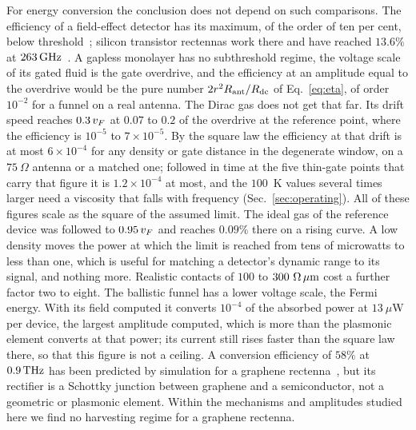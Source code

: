 For energy conversion the conclusion does not depend on such comparisons.
The efficiency of a field-effect detector has its maximum, of the
order of ten per cent, below threshold~\cite{kachorovskii2013performance};
silicon transistor rectennas work there and have reached $13.6\%$ at
$263\,\mathrm{GHz}$~\cite{khan2022cmos}. A gapless monolayer has no subthreshold regime, the voltage
scale of its gated fluid is the gate overdrive, and the efficiency at an
amplitude equal to the overdrive would be the pure number $2r^{2}R_{\mathrm{ant}}/R_{\mathrm{dc}}$ of
Eq.~\eqref{eq:eta}, of order $10^{-2}$ for a funnel on a real antenna.
The Dirac gas does not get that far. Its drift speed reaches $0.3\,v_{F}$
at $0.07$ to $0.2$ of the overdrive at the reference point,
where the efficiency is $10^{-5}$ to
$7\times10^{-5}$. By the square law the efficiency at that drift is at most
$6\times10^{-4}$ for
any density or gate distance in the degenerate window, on a $75\ \Omega$
antenna or a matched one; followed in time at the five
thin-gate points that carry that figure it is
$1.2\times10^{-4}$ at most, and the $100$~K values several times larger
need a viscosity that falls with frequency (Sec.~\ref{sec:operating}).
All of these figures scale as the square of the assumed limit. The ideal
gas of the reference device was followed to $0.95\,v_{F}$ and reaches $0.09\%$
there on a rising curve. A low density moves the power at which the limit
is reached from tens of microwatts to less than one, which is useful for matching a
detector's dynamic range to its signal, and nothing more. Realistic
contacts of $100$ to $300\ \Omega\,\mu\mathrm{m}$ cost a further factor two to eight.
The ballistic funnel has a lower voltage scale, the Fermi energy. With
its field computed it converts $10^{-4}$ of the absorbed power at
$13\ \mu$W per device, the largest
amplitude computed, which is more than the plasmonic element converts at
that power; its current still rises faster than the square
law there, so that this figure is not a ceiling. A conversion efficiency of $58\%$ at
$0.9\,\mathrm{THz}$ has been predicted by simulation for a graphene
rectenna~\cite{dragoman2016graphene}, but its rectifier is a Schottky
junction between graphene and a semiconductor, not a geometric or plasmonic
element. Within the mechanisms and amplitudes studied here we find no
harvesting regime for a graphene rectenna.

